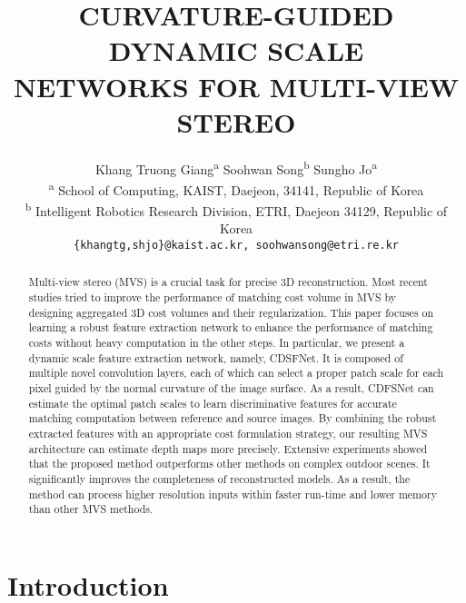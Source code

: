 \documentclass{article} \usepackage{iclr2022_conference,times}
\title{CURVATURE-GUIDED DYNAMIC SCALE \\ NETWORKS FOR MULTI-VIEW STEREO}
\author{Khang Truong Giang\textsuperscript{a} \quad \quad Soohwan Song\textsuperscript{b} \quad \quad Sungho Jo\textsuperscript{a} \\
\textsuperscript{a} {\small School of Computing, KAIST, Daejeon, 34141, Republic of Korea} \\
\textsuperscript{b} {\small Intelligent Robotics Research Division, ETRI, Daejeon 34129, Republic of Korea} \\
\texttt{\{khangtg,shjo\}@kaist.ac.kr, soohwansong@etri.re.kr}
}
\begin{document}
\maketitle

\begin{abstract}
Multi-view stereo (MVS) is a crucial task for precise 3D reconstruction. Most recent studies tried to improve the performance of matching cost volume in MVS by designing aggregated 3D cost volumes and their regularization. This paper focuses on learning a robust feature extraction network to enhance the performance of matching costs without heavy computation in the other steps. In particular, we present a dynamic scale feature extraction network, namely, CDSFNet. It is composed of multiple novel convolution layers, each of which can select a proper patch scale for each pixel guided by the normal curvature of the image surface. As a result, CDFSNet can estimate the optimal patch scales to learn discriminative features for accurate matching computation between reference and source images. By combining the robust extracted features with an appropriate cost formulation strategy, our resulting MVS architecture can estimate depth maps more precisely. Extensive experiments showed that the proposed method outperforms other methods on complex outdoor scenes. It significantly improves the completeness of reconstructed models. As a result, the method can process higher resolution inputs within faster run-time and lower memory than other MVS methods.
\end{abstract}

\section{Introduction}
\end{document}

